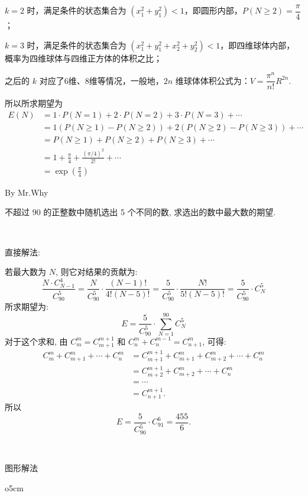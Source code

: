 $ k = 2 $ 时，满足条件的状态集合为 $ (x_1^2+y_1^2) < 1 $，即圆形内部，$ P(N\ge 2)=\dfrac{\pi}{4} $；

$ k = 3 $ 时，满足条件的状态集合为 $ (x_1^2+y_1^2+x_2^2+y_2^2) < 1 $，即四维球体内部，概率为四维球体与四维正方体的体积之比；

之后的 $ k $ 对应了6维、8维等情况，一般地，$ 2n $ 维球体体积公式为：$ V=\dfrac{\pi^n}{n!}R^{2n} $.

所以所求期望为
\begin{align*}
E(N)  &= 1\cdot P(N=1) + 2\cdot P(N=2) + 3\cdot P(N=3) + \cdots \\
	&= 1(P(N\ge 1) - P(N\ge 2)) + 2(P(N\ge 2) - P(N\ge 3)) + \cdots \\
	&= P(N\ge 1) + P(N\ge 2) + P(N\ge 3) + \cdots \\
	& = 1 + \frac{\pi}{4} + \frac{(\pi/4)^2}{2!} + \cdots \\
	& = \exp(\frac{\pi}{4})
\end{align*}

\newpage
\noindent By Mr.Why

不超过 90 的正整数中随机选出 5 个不同的数, 求选出的数中最大数的期望.

~

\noindent 直接解法:

若最大数为 $N$, 则它对结果的贡献为:
\[\frac{N\cdot C_{N-1}^4}{C_{90}^5}=\frac{N}{C_{90}^5}\cdot\frac{(N-1)!}{4!(N-5)!}=\frac{5}{C_{90}^5}\cdot\frac{N!}{5!(N-5)!}=\frac{5}{C_{90}^5}\cdot C_{N}^{5}\]
所求期望为:
\[E = \frac{5}{C_{90}^5}\cdot\sum_{N=1}^{90}{C_N^5}\]
对于这个求和, 由 $C_m^m=C_{m+1}^{m+1}$ 和 $C_n^m + C_n^{m-1}=C_{n+1}^m$, 可得:
\begin{align*}
C_m^m + C_{m+1}^m+\cdots+C_n^m &= C_{m+1}^{m+1}+ C_{m+1}^m + C_{m+2}^m + \cdots + C_n^m \\
&= C_{m+2}^{m+1} + C_{m+2}^m + \cdots + C_n^m \\
&= \cdots \\
&= C_{n+1}^{m+1}.
\end{align*}
所以 
\[E=\frac{5}{C_{90}^5}\cdot C_{91}^6 = \frac{455}{6}.\]

~

\noindent 图形解法

\begin{wrapfigure}{o}{5cm}
\end{wrapfigure}

